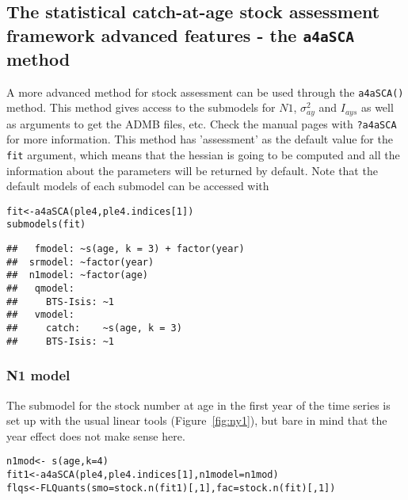 \documentclass[a4paper,english,10pt]{article}\usepackage[]{graphicx}\usepackage[]{color}
\makeatletter
\newcommand{\hlnum}[1]{\textcolor[rgb]{0.2,0.2,0.2}{#1}}%
\newcommand{\hlopt}[1]{\textcolor[rgb]{0.2,0.2,0.2}{#1}}%
\newcommand{\hlstd}[1]{\textcolor[rgb]{0,0,0}{#1}}%
\newcommand{\hlkwb}[1]{\textcolor[rgb]{0.361,0.506,0.596}{#1}}%
\newcommand{\hlkwc}[1]{\textcolor[rgb]{0.361,0.506,0.596}{#1}}%
\newcommand{\hlkwd}[1]{\textcolor[rgb]{0.361,0.506,0.596}{#1}}%
\newenvironment{kframe}{%
 \def\at@end@of@kframe{}%
 \ifinner\ifhmode%
  \def\at@end@of@kframe{\end{minipage}}%
  \begin{minipage}{\columnwidth}%
 \fi\fi%
 \def\FrameCommand##1{\hskip\@totalleftmargin \hskip-\fboxsep
 \colorbox{shadecolor}{##1}\hskip-\fboxsep
     \hskip-\linewidth \hskip-\@totalleftmargin \hskip\columnwidth}%
 \MakeFramed {\advance\hsize-\width
   \@totalleftmargin\z@ \linewidth\hsize
   \@setminipage}}%
 {\par\unskip\endMakeFramed%
 \at@end@of@kframe}
\newenvironment{knitrout}{}{} %
\newcommand{\code}[1]{{\texttt{#1}}}
\makeatother
\begin{document}
\subsection{The statistical catch-at-age stock assessment framework advanced features - the \code{a4aSCA} method}

A more advanced method for stock assessment can be used through the \code{a4aSCA()} method. This method gives access to the submodels for $N1$, $\sigma^2_{ay}$ and $I_{ays}$ as well as arguments to get the ADMB files, etc. Check the manual pages with \code{?a4aSCA} for more information. This method has 'assessment' as the default value for the \code{fit} argument, which means that the hessian is going to be computed and all the information about the parameters will be returned by default. Note that the default models of each submodel can be accessed with

\begin{knitrout}
\color{fgcolor}\begin{kframe}
\begin{alltt}
\hlstd{fit} \hlkwb{<-} \hlkwd{a4aSCA}\hlstd{(ple4, ple4.indices[}\hlnum{1}\hlstd{])}
\hlkwd{submodels}\hlstd{(fit)}
\end{alltt}
\begin{verbatim}
## 	 fmodel: ~s(age, k = 3) + factor(year)
## 	srmodel: ~factor(year)
## 	n1model: ~factor(age)
## 	 qmodel:
## 	   BTS-Isis: ~1
## 	 vmodel:
## 	   catch:    ~s(age, k = 3)
## 	   BTS-Isis: ~1
\end{verbatim}
\end{kframe}
\end{knitrout}

\subsubsection{N1 model}

The submodel for the stock number at age in the first year of the time series is set up with the usual linear tools (Figure~\ref{fig:ny1}), but bare in mind that the year effect does not make sense here.

\begin{knitrout}
\color{fgcolor}\begin{kframe}
\begin{alltt}
\hlstd{n1mod} \hlkwb{<-} \hlopt{~}\hlkwd{s}\hlstd{(age,} \hlkwc{k}\hlstd{=}\hlnum{4}\hlstd{)}
\hlstd{fit1} \hlkwb{<-} \hlkwd{a4aSCA}\hlstd{(ple4, ple4.indices[}\hlnum{1}\hlstd{],} \hlkwc{n1model}\hlstd{=n1mod)}
\hlstd{flqs} \hlkwb{<-} \hlkwd{FLQuants}\hlstd{(}\hlkwc{smo}\hlstd{=}\hlkwd{stock.n}\hlstd{(fit1)[,}\hlnum{1}\hlstd{],} \hlkwc{fac}\hlstd{=}\hlkwd{stock.n}\hlstd{(fit)[,}\hlnum{1}\hlstd{])}
\end{alltt}
\end{kframe}
\end{knitrout}
\end{document}
